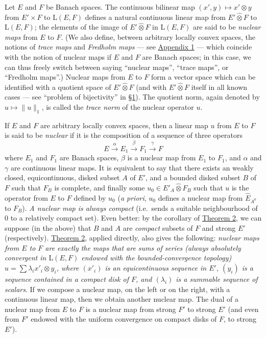 \documentclass[british]{article}
\newcommand{\oldpage}[1]{\marginpar{\footnotesize$\Big\vert$ \textit{p.~#1}}}
\begin{document}
Let \(E\) and \(F\) be Banach spaces. The continuous bilinear map
\((x',y)\mapsto x'\otimes y\) from \(E'\times F\) to \(\mathrm{L}(E,F)\)
defines a natural continuous linear map from \(E'\hat{\otimes}F\) to
\(\mathrm{L}(E,F)\); the elements of the image of \(E'\hat{\otimes}F\)
in \(\mathrm{L}(E,F)\) are said to be \emph{nuclear maps} from \(E\) to
\(F\). (We also define, between arbitrary locally convex spaces, the
notions of \emph{trace maps} and \emph{Fredholm maps} --- see
\hyperref[section-1-appendix-1]{Appendix 1} --- which coincide with the
notion of nuclear maps if \(E\) and \(F\) are Banach spaces; in this
case, we can thus freely switch between saying ``nuclear maps'', ``trace
maps'', or ``Fredholm maps''.) Nuclear maps from \(E\) to \(F\) form a
vector space which can be identified with a quotient space of
\(E'\hat{\otimes}F\) (and with \(E'\hat{\otimes}F\) itself in all known
cases --- see ``problem of bijectivity'' in \hyperref[section-1]{§1}).
The quotient norm, again denoted by \(u\mapsto\|u\|_1\), is called the
\emph{trace norm} of the nuclear operator \(u\).

If \(E\) and \(F\) are arbitrary locally convex spaces, then a linear
map \(u\) from \(E\) to \(F\) is said to be \emph{nuclear} if it is the
composition of a sequence of three operators \[
  E \xrightarrow{\alpha} E_1 \xrightarrow{\beta} F_1 \xrightarrow{\gamma} F
\] where \(E_1\) and \(F_1\) are Banach spaces, \(\beta\) is a nuclear
map from \(E_1\) to \(F_1\), and \(\alpha\) and \(\gamma\) are
continuous linear maps. \oldpage{86} It is equivalent to say that there
exists an weakly closed, equicontinuous, disked subset \(A\) of \(E'\),
and a bounded disked subset \(B\) of \(F\) such that \(F_B\) is
complete, and finally some \(u_0\in E'_A\hat{\otimes}F_B\) such that
\(u\) is the operator from \(E\) to \(F\) defined by \(u_0\) (\emph{a
priori}, \(u_0\) defines a nuclear map from \(\widehat{E}_{A^0}\) to
\(F_B\)). \emph{A nuclear map is always compact} (i.e.~sends a suitable
neighbourhood of \(0\) to a relatively compact set). Even better: by the
corollary of \hyperref[section-1-theorem-2]{Theorem 2}, we can suppose
(in the above) that \(B\) and \(A\) are \emph{compact} subsets of \(F\)
and strong \(E'\) (respectively). \hyperref[section-1-theorem-2]{Theorem
2}, applied directly, also gives the following: \emph{nuclear maps from
\(E\) to \(F\) are exactly the maps that are sums of series (always
absolutely convergent in \(\mathrm{L}(E,F)\) endowed with the
bounded-convergence topology) \(u=\sum\lambda_i x'_i\otimes y_i\), where
\((x'_i)\) is an equicontinuous sequence in \(E'\), \((y_i)\) is a
sequence contained in a compact disk of \(F\), and \((\lambda_i)\) is a
summable sequence of scalars}. If we compose a nuclear map, on the left
or on the right, with a continuous linear map, then we obtain another
nuclear map. The dual of a nuclear map from \(E\) to \(F\) is a nuclear
map from strong \(F'\) to strong \(E'\) (and even from \(F'\) endowed
with the uniform convergence on compact disks of \(F\), to strong
\(E'\)).
\end{document}
